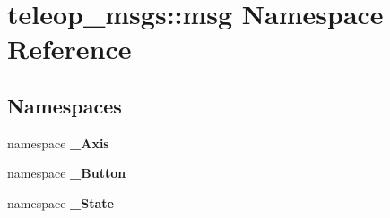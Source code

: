 \section{teleop\_\-msgs::msg Namespace Reference}
\label{namespaceteleop__msgs_1_1msg}
\subsection*{Namespaces}
\begin{DoxyCompactItemize}
\item 
namespace {\bf \_\-Axis}
\item 
namespace {\bf \_\-Button}
\item 
namespace {\bf \_\-State}
\end{DoxyCompactItemize}
